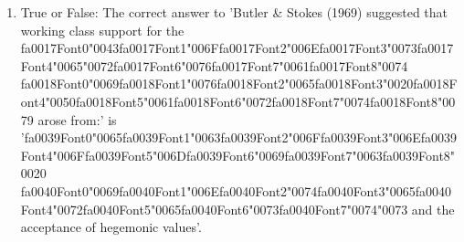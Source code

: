 \documentclass[12pt]{article}
\begin{document}
\begin{enumerate}[label=\arabic*.]
\item True or False: The correct answer to 'Butler \& Stokes (1969) suggested that working class support for the {\csname fa0017Font0\endcsname\char"0043}{\csname fa0017Font1\endcsname\char"006F}{\csname fa0017Font2\endcsname\char"006E}{\csname fa0017Font3\endcsname\char"0073}{\csname fa0017Font4\endcsname\char"0065}{\char"0072}{\csname fa0017Font6\endcsname\char"0076}{\csname fa0017Font7\endcsname\char"0061}{\csname fa0017Font8\endcsname\char"0074} {\csname fa0018Font0\endcsname\char"0069}{\csname fa0018Font1\endcsname\char"0076}{\csname fa0018Font2\endcsname\char"0065}{\csname fa0018Font3\endcsname\char"0020}{\csname fa0018Font4\endcsname\char"0050}{\csname fa0018Font5\endcsname\char"0061}{\csname fa0018Font6\endcsname\char"0072}{\csname fa0018Font7\endcsname\char"0074}{\csname fa0018Font8\endcsname\char"0079} arose from:' is '{\csname fa0039Font0\endcsname\char"0065}{\csname fa0039Font1\endcsname\char"0063}{\csname fa0039Font2\endcsname\char"006F}{\csname fa0039Font3\endcsname\char"006E}{\csname fa0039Font4\endcsname\char"006F}{\csname fa0039Font5\endcsname\char"006D}{\csname fa0039Font6\endcsname\char"0069}{\csname fa0039Font7\endcsname\char"0063}{\csname fa0039Font8\endcsname\char"0020} {\csname fa0040Font0\endcsname\char"0069}{\csname fa0040Font1\endcsname\char"006E}{\csname fa0040Font2\endcsname\char"0074}{\csname fa0040Font3\endcsname\char"0065}{\csname fa0040Font4\endcsname\char"0072}{\csname fa0040Font5\endcsname\char"0065}{\csname fa0040Font6\endcsname\char"0073}{\csname fa0040Font7\endcsname\char"0074}{\char"0073} and the acceptance of hegemonic values'.

\end{enumerate}
\end{document}
